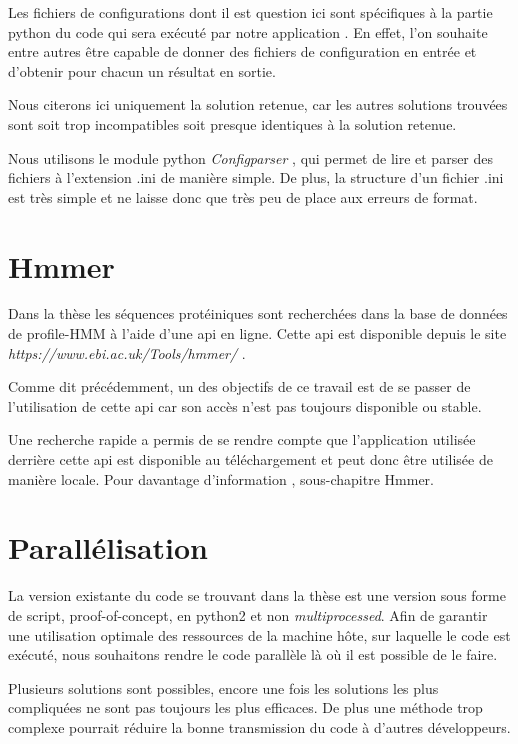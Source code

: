 Les fichiers de configurations dont il est question ici sont spécifiques à la partie python du code qui sera exécuté par notre application . En effet, l'on souhaite entre autres être capable de donner des fichiers de configuration en entrée et d'obtenir pour chacun un résultat en sortie.

Nous citerons ici uniquement la solution retenue, car les autres solutions trouvées sont soit trop incompatibles soit presque identiques à la solution retenue.

Nous utilisons le module python \emph{Configparser} \cite{13}, qui permet de lire et parser des fichiers à l'extension .ini de manière simple. De plus, la structure d'un fichier .ini est très simple et ne laisse donc que très peu de place aux erreurs de format.
 
 
\section{Hmmer}
Dans la thèse \thLeite les séquences protéiniques sont recherchées dans la base de données de profile-HMM à l'aide d'une \gls{api} en ligne. Cette \gls{api} est disponible depuis le site \emph{https://www.ebi.ac.uk/Tools/hmmer/} \cite{19}. 

Comme dit précédemment, un des objectifs de ce travail est de se passer de l'utilisation de cette \gls{api} car son accès n'est pas toujours disponible ou stable.

Une recherche rapide a permis de se rendre compte que l'application utilisée derrière cette \gls{api} est disponible au téléchargement et peut donc être utilisée de manière locale. Pour davantage d'information , sous-chapitre Hmmer.


\section{Parallélisation}

La version existante du code se trouvant dans la thèse \thLeite est une version sous forme de script, proof-of-concept, en python2 et non \emph{multiprocessed}. Afin de garantir une utilisation optimale des ressources de la machine hôte, sur laquelle le code est exécuté, nous souhaitons rendre le code parallèle là où il est possible de le faire.

Plusieurs solutions sont possibles, encore une fois les solutions les plus compliquées ne sont pas toujours les plus efficaces. De plus une méthode trop complexe pourrait réduire la bonne transmission du code à d'autres développeurs.

